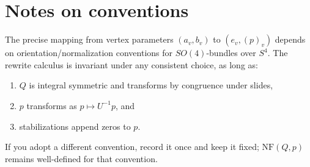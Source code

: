 \documentclass[11pt]{article}
\newcommand{\NF}{\mathrm{NF}}
\begin{document}
\section{Notes on conventions}
The precise mapping from vertex parameters $(a_v,b_v)$ to $(e_v,(p)_v)$ depends on orientation/normalization conventions for $SO(4)$-bundles over $S^4$. The rewrite calculus is invariant under any consistent choice, as long as:
\begin{enumerate}[label=\arabic*.]
\item $Q$ is integral symmetric and transforms by congruence under slides,
\item $p$ transforms as $p\mapsto U^{-1}p$, and
\item stabilizations append zeros to $p$.
\end{enumerate}
If you adopt a different convention, record it once and keep it fixed; $\NF(Q,p)$ remains well-defined for that convention.
\end{document}
